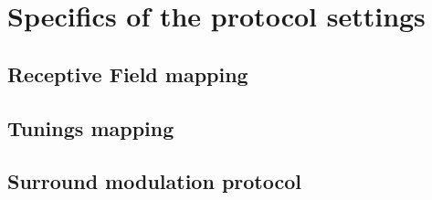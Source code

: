 \section{Specifics of the protocol settings}
\label{sec:sectionc}

\subsection{Receptive Field mapping}
\label{subsec:subasectionC}

\subsection{Tunings mapping}
\label{subsec:subbsectionC}

\subsection{Surround modulation protocol}
\label{subsec:subcsectionC}